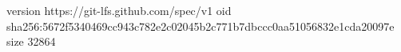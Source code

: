 version https://git-lfs.github.com/spec/v1
oid sha256:5672f5340469cc943c782e2c02045b2c771b7dbccc0aa51056832e1cda20097e
size 32864
